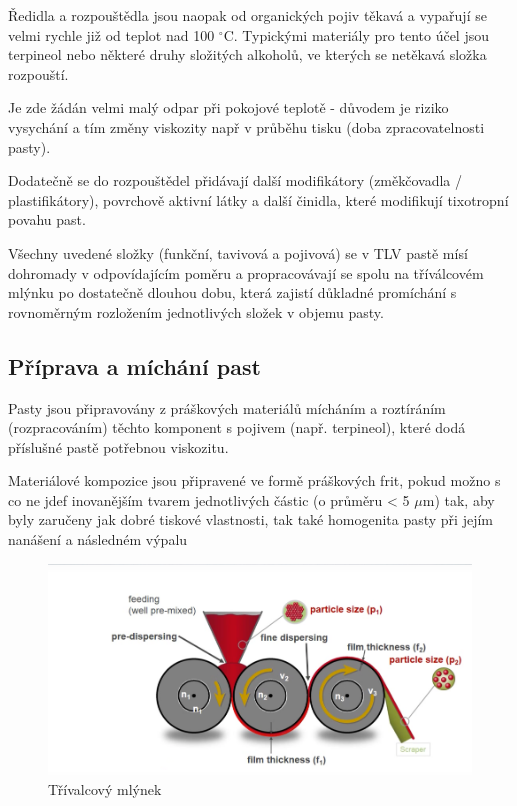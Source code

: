  Ředidla a rozpouštědla jsou naopak od organických pojiv těkavá a vypařují se velmi rychle
již od teplot nad 100 $^{\circ}$C. Typickými materiály pro tento účel jsou terpineol nebo některé druhy složitých alkoholů, ve kterých se netěkavá složka rozpouští.

Je zde žádán velmi malý odpar při pokojové teplotě - důvodem je riziko vysychání a tím
změny viskozity např v průběhu tisku (doba zpracovatelnosti pasty).

Dodatečně se do rozpouštědel přidávají další modifikátory (změkčovadla / plastifikátory),
povrchově aktivní látky a další činidla, které modifikují tixotropní povahu past.

Všechny uvedené složky (funkční, tavivová a pojivová) se v TLV pastě mísí dohromady v
odpovídajícím poměru a propracovávají se spolu na tříválcovém mlýnku po dostatečně dlouhou
dobu, která zajistí důkladné promíchání s rovnoměrným rozložením jednotlivých složek v objemu
pasty.

\subsection{Příprava a míchání past}
Pasty jsou připravovány z práškových materiálů mícháním a roztíráním
(rozpracováním) těchto komponent s pojivem (např. terpineol),
které dodá příslušné pastě potřebnou viskozitu.

Materiálové kompozice jsou připravené
ve formě práškových frit, pokud možno
s co ne jdef inovanějším tvarem
jednotlivých částic (o průměru < 5 $\mu$m)
tak, aby byly zaručeny jak dobré tiskové
vlastnosti, tak také homogenita pasty při
jejím nanášení a následném výpalu

\begin{figure}[h]
   \begin{center}
     \includegraphics[scale=0.6]{images/mlyn.png}
   \end{center}
   \caption{Třívalcový mlýnek}
\end{figure}

